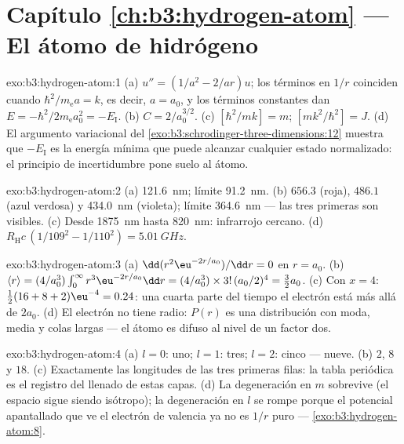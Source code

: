 \section*{Capítulo \ref{ch:b3:hydrogen-atom} --- El átomo de hidrógeno}

\begin{solution}{exo:b3:hydrogen-atom:1}
(a) $u'' = (1/a^2 - 2/ar)u$; los términos en $1/r$ coinciden cuando
$\hbar^2/m_{\text{e}}a = k$, es decir, $a = a_0$, y los términos constantes
dan $E = -\hbar^2/2m_{\text{e}}a_0^2 = -E_{\text{I}}$. (b) $C =
2/a_0^{3/2}$. (c) $[\hbar^2/mk] = \unit{m}$; $[mk^2/\hbar^2] =
\unit{J}$. (d) El argumento variacional del
\cref{exo:b3:schrodinger-three-dimensions:12} muestra que $-E_{\text{I}}$
es la energía mínima que puede alcanzar cualquier estado normalizado: el
principio de incertidumbre pone suelo al átomo.
\end{solution}

\begin{solution}{exo:b3:hydrogen-atom:2}
(a) \qty{121.6}{nm}; límite \qty{91.2}{nm}. (b) $656.3$ (roja),
$486.1$ (azul verdosa) y \qty{434.0}{nm} (violeta); límite
\qty{364.6}{nm} --- las tres primeras son visibles. (c) Desde
\qty{1875}{nm} hasta \qty{820}{nm}: infrarrojo cercano. (d)
$R_{\text{H}}c\,(1/109^2 - 1/110^2) = \qty{5.01}{GHz}$.
\end{solution}

\begin{solution}{exo:b3:hydrogen-atom:3}
(a) $\dd(r^2\eu^{-2r/a_0})/\dd r = 0$ en $r = a_0$. (b) $\langle r\rangle = (4/a_0^3)\int_0^\infty
r^3\eu^{-2r/a_0}\dd r = (4/a_0^3)\times 3!\,(a_0/2)^4 = \tfrac32
a_0$. (c) Con $x = 4$:
$\tfrac12(16 + 8 + 2)\eu^{-4} = 0.24$: una cuarta parte del tiempo el
electrón está más allá de $2a_0$. (d) El electrón no tiene radio: $P(r)$
es una distribución con moda, media y colas largas --- el átomo
es difuso al nivel de un factor dos.
\end{solution}

\begin{solution}{exo:b3:hydrogen-atom:4}
(a) $l = 0$: uno; $l = 1$: tres; $l = 2$: cinco --- nueve. (b) $2$,
$8$ y $18$. (c) Exactamente las longitudes de las tres primeras filas: la
tabla periódica es el registro del llenado de estas capas. (d) La
degeneración en $m$ sobrevive (el espacio sigue siendo isótropo); la
degeneración en $l$ se rompe porque el potencial apantallado que ve el
electrón de valencia ya no es $1/r$ puro ---
\cref{exo:b3:hydrogen-atom:8}.
\end{solution}

